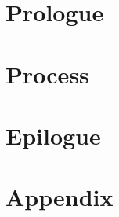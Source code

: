 

\part{Prologue}



\cleardoublepage
\part{Process} %





\part{Epilogue}


\part{Appendix} %

\appendix

